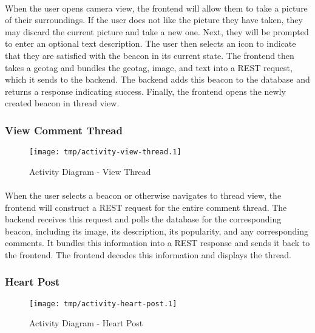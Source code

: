         \paragraph*{}
        When the user opens camera view, the frontend will allow them to take a picture
        of their surroundings. If the user does not like the picture they have taken,
        they may discard the current picture and take a new one. Next, they will be
        prompted to enter an optional text description. The user then selects an icon
        to indicate that they are satisfied with the beacon in its current state. The
        frontend then takes a geotag and bundles the geotag, image, and text into a
        REST request, which it sends to the backend. The backend adds this beacon to
        the database and returns a response indicating success. Finally, the frontend
        opens the newly created beacon in thread view.

        \subsubsection{View Comment Thread}
        \begin{figure}[H]
            \centering
            \texttt{[image: tmp/activity-view-thread.1]} 
            \caption{Activity Diagram - View Thread}
        \end{figure}

        \paragraph*{}
        When the user selects a beacon or otherwise navigates to thread view, the
        frontend will construct a REST request for the entire comment thread. The
        backend receives this request and polls the database for the corresponding
        beacon, including its image, its description, its popularity, and any 
        corresponding comments. It bundles this information into a REST response
        and sends it back to the frontend. The frontend decodes this information
        and displays the thread.

        \subsubsection{Heart Post}
        \begin{figure}[H]
            \centering
            \texttt{[image: tmp/activity-heart-post.1]} 
            \caption{Activity Diagram - Heart Post}
        \end{figure}

